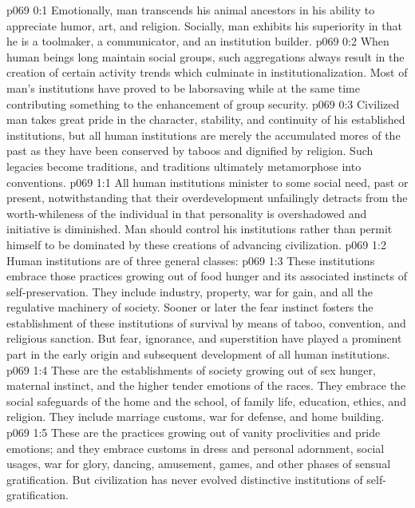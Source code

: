 \author{Melchizedek}
\vs p069 0:1 Emotionally, man transcends his animal ancestors in his ability to appreciate humor, art, and religion. Socially, man exhibits his superiority in that he is a toolmaker, a communicator, and an institution builder.
\vs p069 0:2 When human beings long maintain social groups, such aggregations always result in the creation of certain activity trends which culminate in institutionalization. Most of man’s institutions have proved to be laborsaving while at the same time contributing something to the enhancement of group security.
\vs p069 0:3 Civilized man takes great pride in the character, stability, and continuity of his established institutions, but all human institutions are merely the accumulated mores of the past as they have been conserved by taboos and dignified by religion. Such legacies become traditions, and traditions ultimately metamorphose into conventions.
\vs p069 1:1 All human institutions minister to some social need, past or present, notwithstanding that their overdevelopment unfailingly detracts from the worth\hyp{}whileness of the individual in that personality is overshadowed and initiative is diminished. Man should control his institutions rather than permit himself to be dominated by these creations of advancing civilization.
\pc \vs p069 1:2 Human institutions are of three general classes:
\pc \vs p069 1:3 \bibnobreakspace {} These institutions embrace those practices growing out of food hunger and its associated instincts of self\hyp{}preservation. They include industry, property, war for gain, and all the regulative machinery of society. Sooner or later the fear instinct fosters the establishment of these institutions of survival by means of taboo, convention, and religious sanction. But fear, ignorance, and superstition have played a prominent part in the early origin and subsequent development of all human institutions.\plusone
\pc \vs p069 1:4 \bibnobreakspace {} These are the establishments of society growing out of sex hunger, maternal instinct, and the higher tender emotions of the races. They embrace the social safeguards of the home and the school, of family life, education, ethics, and religion. They include marriage customs, war for defense, and home building.
\pc \vs p069 1:5 \bibnobreakspace {} These are the practices growing out of vanity proclivities and pride emotions; and they embrace customs in dress and personal adornment, social usages, war for glory, dancing, amusement, games, and other phases of sensual gratification. But civilization has never evolved distinctive institutions of self\hyp{}gratification.\plusone
